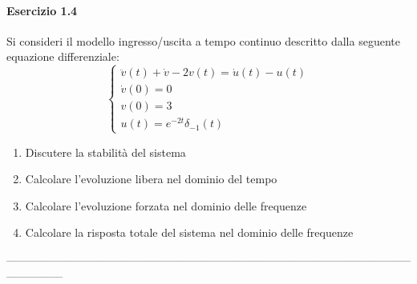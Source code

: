 \documentclass[12pt,a4paper]{article}
\begin{document}
	\paragraph*{Esercizio 1.4} Si consideri il modello ingresso/uscita a tempo continuo descritto dalla seguente equazione differenziale:
	\[
	\begin{cases}
		\ddot{v}(t) + \dot{v} -2v(t) = \dot{u}(t) - u(t)\\
		\dot{v}(0) = 0\\
		v(0) = 3\\
		u(t) = e^{-2t}\delta_{-1}(t)
	\end{cases}
	\]
	\begin{enumerate}
		\item Discutere la stabilità del sistema
		\item Calcolare l'evoluzione libera nel dominio del tempo
		\item Calcolare l'evoluzione forzata nel dominio delle frequenze
		\item Calcolare la risposta totale del sistema nel dominio delle frequenze
	\end{enumerate}
	---------------------------------------------------------------------------------------------------------------------------
\end{document}
